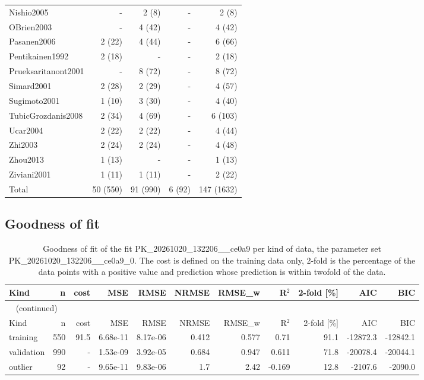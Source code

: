 \documentclass{article}
\begin{document}
\begin{longtable}{lrrrr}
Nishio2005 & - & 2 (8) & - & 2 (8) \\
OBrien2003 & - & 4 (42) & - & 4 (42) \\
Pasanen2006 & 2 (22) & 4 (44) & - & 6 (66) \\
Pentikainen1992 & 2 (18) & - & - & 2 (18) \\
Prueksaritanont2001 & - & 8 (72) & - & 8 (72) \\
Simard2001 & 2 (28) & 2 (29) & - & 4 (57) \\
Sugimoto2001 & 1 (10) & 3 (30) & - & 4 (40) \\
TubicGrozdanis2008 & 2 (34) & 4 (69) & - & 6 (103) \\
Ucar2004 & 2 (22) & 2 (22) & - & 4 (44) \\
Zhi2003 & 2 (24) & 2 (24) & - & 4 (48) \\
Zhou2013 & 1 (13) & - & - & 1 (13) \\
Ziviani2001 & 1 (11) & 1 (11) & - & 2 (22) \\
Total & 50 (550) & 91 (990) & 6 (92) & 147 (1632) \\
\end{longtable}

\subsection{Goodness of fit}

\begin{longtable}{lrrrrrrrrrr}
\caption{Goodness of fit of the fit PK\_20261020\_132206\_\_ce0a9 per kind of data, the parameter set PK\_20261020\_132206\_\_ce0a9\_0. The cost is defined on the training data only, 2-fold is the percentage of the data points with a positive value and prediction whose prediction is within twofold of the data.}\label{tab:metrics:PK_20261020_132206__ce0a9} \\
\toprule
Kind & n & cost & MSE & RMSE & NRMSE & RMSE\_w & R\ensuremath{^{2}} & 2-fold [\%] & AIC & BIC \\
\midrule
\endfirsthead
\multicolumn{11}{l}{\small\tablename~\thetable{} (continued)} \\
\toprule
Kind & n & cost & MSE & RMSE & NRMSE & RMSE\_w & R\ensuremath{^{2}} & 2-fold [\%] & AIC & BIC \\
\midrule
\endhead
\bottomrule
\endlastfoot
training & 550 & 91.5 & 6.68e-11 & 8.17e-06 & 0.412 & 0.577 & 0.71 & 91.1 & -12872.3 & -12842.1 \\
validation & 990 & - & 1.53e-09 & 3.92e-05 & 0.684 & 0.947 & 0.611 & 71.8 & -20078.4 & -20044.1 \\
outlier & 92 & - & 9.65e-11 & 9.83e-06 & 1.7 & 2.42 & -0.169 & 12.8 & -2107.6 & -2090.0 \\
\end{longtable}
\end{document}
